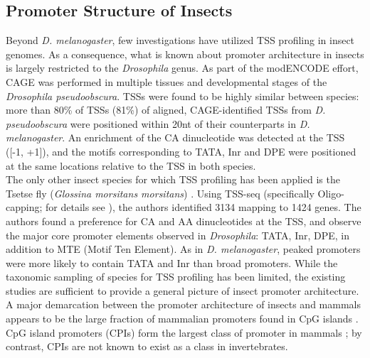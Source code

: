 \documentclass[runningheads,a4paper]{llncs}
\begin{document}
\begin{linenumbers}
\subsection{Promoter Structure of Insects}
Beyond \textit{D. melanogaster}, few investigations have utilized TSS profiling in insect genomes. 
As a consequence, what is known about promoter architecture in insects is largely restricted to the \textit{Drosophila} genus. 
As part of the modENCODE effort, CAGE was performed in multiple tissues and developmental stages of the \textit{Drosophila pseudoobscura}. 
TSSs were found to be highly similar between species: more than 80\% of TSSs (81\%) of aligned, CAGE-identified TSSs from \textit{D. pseudoobscura} were positioned within 20nt of their counterparts in \textit{D. melanogaster}.
An enrichment of the CA dinucleotide was detected at the TSS ([-1, +1]), and the motifs corresponding to TATA, Inr and DPE were positioned at the same locations relative to the TSS in both species.
\\
\indent
The only other insect species for which TSS profiling has been applied is the Tsetse fly (\textit{Glossina morsitans morsitans}) \cite{Mwangi:2015kn}. 
Using TSS-seq (specifically Oligo-capping; for details see \cite{Tsuchihara:2009dm}), the authors identified 3134 mapping to 1424 genes. 
The authors found a preference for CA and AA dinucleotides at the TSS, and observe the major core promoter elements observed in \textit{Drosophila}: TATA, Inr, DPE, in addition to MTE (Motif Ten Element).
As in \textit{D. melanogaster}, peaked promoters were more likely to contain TATA and Inr than broad promoters. 
While the taxonomic sampling of species for TSS profiling has been limited, the existing studies are sufficient to provide a general picture of insect promoter architecture.
A major demarcation between the promoter architecture of insects and mammals appears to be the large fraction of mammalian promoters found in CpG islands \cite{Mwangi:2015kn}.
CpG island promoters (CPIs) form the largest class of promoter in mammals \cite{Cvetesic:2017hl}; by contrast, CPIs are not known to exist as a class in invertebrates.



\end{linenumbers}
\end{document}
